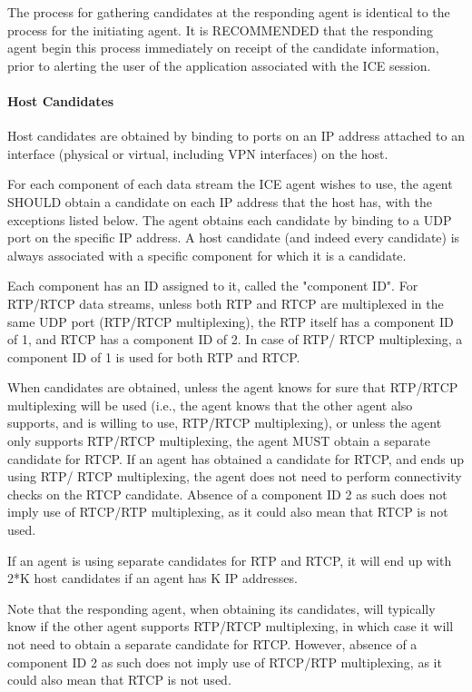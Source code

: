 \documentclass{article}
\begin{document}
The process for gathering candidates at the responding agent is identical to the process for the initiating agent.  It is RECOMMENDED that the responding agent begin this process immediately on receipt of the candidate information, prior to alerting the user of the application associated with the ICE session.

\paragraph{Host Candidates}

Host candidates are obtained by binding to ports on an IP address attached to an interface (physical or virtual, including VPN interfaces) on the host.

For each component of each data stream the ICE agent wishes to use, the agent SHOULD obtain a candidate on each IP address that the host has, with the exceptions listed below.  The agent obtains each candidate by binding to a UDP port on the specific IP address.  A host candidate (and indeed every candidate) is always associated with a specific component for which it is a candidate.

Each component has an ID assigned to it, called the "component ID". For RTP/RTCP data streams, unless both RTP and RTCP are multiplexed in the same UDP port (RTP/RTCP multiplexing), the RTP itself has a component ID of 1, and RTCP has a component ID of 2.  In case of RTP/ RTCP multiplexing, a component ID of 1 is used for both RTP and RTCP.

When candidates are obtained, unless the agent knows for sure that RTP/RTCP multiplexing will be used (i.e., the agent knows that the other agent also supports, and is willing to use, RTP/RTCP multiplexing), or unless the agent only supports RTP/RTCP multiplexing, the agent MUST obtain a separate candidate for RTCP. If an agent has obtained a candidate for RTCP, and ends up using RTP/ RTCP multiplexing, the agent does not need to perform connectivity checks on the RTCP candidate.  Absence of a component ID 2 as such does not imply use of RTCP/RTP multiplexing, as it could also mean that RTCP is not used.

If an agent is using separate candidates for RTP and RTCP, it will end up with 2*K host candidates if an agent has K IP addresses.

Note that the responding agent, when obtaining its candidates, will typically know if the other agent supports RTP/RTCP multiplexing, in which case it will not need to obtain a separate candidate for RTCP. However, absence of a component ID 2 as such does not imply use of RTCP/RTP multiplexing, as it could also mean that RTCP is not used.
\end{document}
